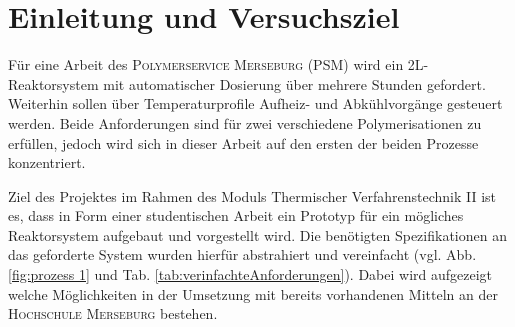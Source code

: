 \section{Einleitung und Versuchsziel}
\label{sec:aufgabenstellung}

Für eine Arbeit des \textsc{Polymerservice Merseburg (PSM)} wird ein 2L-Reaktorsystem mit automatischer Dosierung über mehrere Stunden gefordert. Weiterhin sollen über Temperaturprofile Aufheiz- und Abkühlvorgänge gesteuert werden. Beide Anforderungen sind für zwei verschiedene Polymerisationen zu erfüllen, jedoch wird sich in dieser Arbeit auf den ersten der beiden Prozesse konzentriert. 

Ziel des Projektes im Rahmen des Moduls Thermischer Verfahrenstechnik II ist es, dass in Form einer studentischen Arbeit ein Prototyp für ein mögliches Reaktorsystem aufgebaut und vorgestellt wird. Die benötigten Spezifikationen an das geforderte System wurden hierfür abstrahiert und vereinfacht (vgl. Abb. \ref{fig:prozess 1} und Tab. \ref{tab:verinfachteAnforderungen}). Dabei wird aufgezeigt welche Möglichkeiten in der Umsetzung mit bereits vorhandenen Mitteln an der \textsc{Hochschule Merseburg} bestehen.

